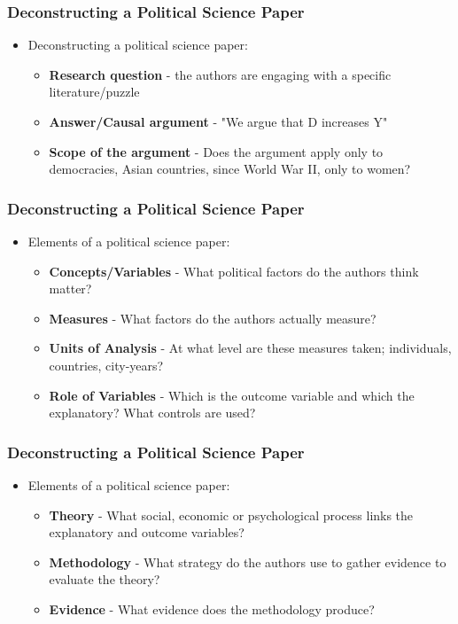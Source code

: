 \documentclass[xcolor=x11names,compress]{beamer}\usepackage[]{graphicx}\usepackage[]{color}
\renewcommand{\(}{\begin{columns}}
\renewcommand{\)}{\end{columns}}
\newcommand{\<}[1]{\begin{column}{#1}}
\renewcommand{\>}{\end{column}}
\begin{document}
\begin{frame}
\frametitle{Deconstructing a Political Science Paper}
\begin{itemize}
\item Deconstructing a political science paper:
\pause
\begin{itemize}
\item \textbf{Research question} - the authors are engaging with a specific literature/puzzle
\pause
\item \textbf{Answer/Causal argument} - "We argue that D increases Y"
\pause
\item \textbf{Scope of the argument} - Does the argument apply only to democracies, Asian countries, since World War II, only to women?
\end{itemize}
\end{itemize}
\end{frame}

\begin{frame}
\frametitle{Deconstructing a Political Science Paper}
\begin{itemize}
\item Elements of a political science paper:
\pause
\begin{itemize}
\item \textbf{Concepts/Variables} - What political factors do the authors think matter?
\pause
\item \textbf{Measures} - What factors do the authors actually measure?
\pause
\item \textbf{Units of Analysis} - At what level are these measures taken; individuals, countries, city-years?
\pause
\item \textbf{Role of Variables} - Which is the outcome variable and which the explanatory? What controls are used?
\end{itemize}
\end{itemize}
\end{frame}


\begin{frame}
\frametitle{Deconstructing a Political Science Paper}
\begin{itemize}
\item Elements of a political science paper:
\pause
\begin{itemize}
\item \textbf{Theory} - What social, economic or psychological process links the explanatory and outcome variables? 
\pause
\item \textbf{Methodology} - What strategy do the authors use to gather evidence to evaluate the theory?
\pause
\item \textbf{Evidence} - What evidence does the methodology produce?
\end{itemize}
\end{itemize}
\end{frame}
\end{document}
